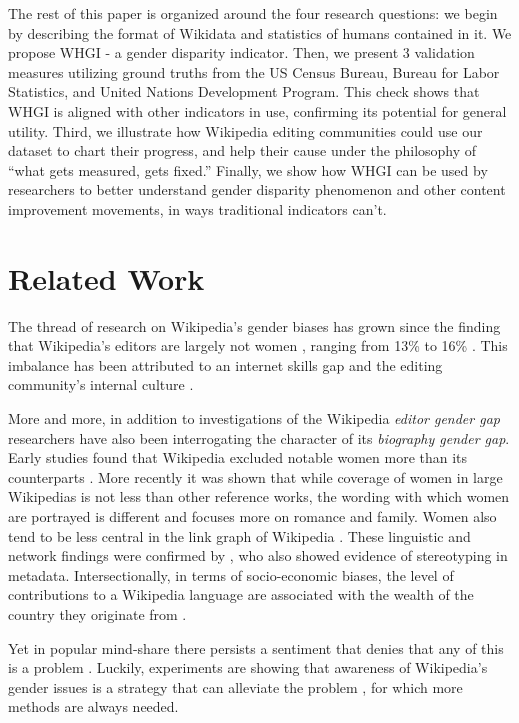 \documentclass{sig-alternate-05-2015}
\begin{document}
The rest of this paper is organized around the four research questions: we begin by describing the format of Wikidata and statistics of humans contained in it. We propose WHGI - a gender disparity indicator. Then, we present 3 validation measures utilizing ground truths from the US Census Bureau, Bureau for Labor Statistics, and United Nations Development Program. This check shows that WHGI is aligned with other indicators in use, confirming its potential for general utility. Third, we illustrate how Wikipedia editing communities could use our dataset to chart their progress, and help their cause under the philosophy of ``what gets measured, gets fixed.'' Finally, we show how WHGI can be used by researchers to better understand gender disparity phenomenon and other content improvement movements, in ways traditional indicators can't.


\section{Related Work}

The thread of research on Wikipedia's gender biases has grown since the finding that Wikipedia's editors are largely not women \cite{glott2010wikipedia} \cite{lam_wp:clubhouse?:_2011}, ranging from 13\% to 16\% \cite{hill_wikipedia_2013}. This imbalance has been attributed to an internet skills gap \cite{hargittai_mind_2015} and the editing community's internal culture \cite{lam_wp:clubhouse?:_2011}. 

More and more, in addition to investigations of the Wikipedia \textit{editor gender gap} researchers have also been interrogating the character of its \textit{biography gender gap}. Early studies found that Wikipedia excluded notable women more than its counterparts \cite{reagle_gender_2011}. More recently \cite{wagner_its_2015} it was shown that while coverage of women in large Wiki\-pedias is not less than other reference works, the wording with which women are portrayed is different and focuses more on romance and family. Women also tend to be less central in the link graph of Wikipedia \cite{10.1371/journal.pone.0114825}. These linguistic and network findings were confirmed by \cite{graells-garrido_first_2015}, who also showed evidence of stereotyping in metadata. Intersectionally, in terms of socio-economic biases, the level of contributions to a Wikipedia language are associated with the wealth of the country they originate from \cite{rask_reach_2008}.

Yet in popular mind-share there persists a sentiment that denies that any of this is a problem \cite{eckert_retriggering_2013}. Luckily, experiments are showing that awareness of Wikipedia's gender issues is a strategy that can alleviate the problem \cite{hinnosaar_gender_2015}, for which more methods are always needed.
\end{document}
